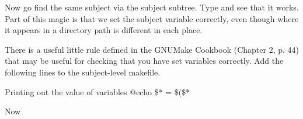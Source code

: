 Now go find the same subject via the subject subtree. Type
 and see that it works. Part of this magic is that we set
the subject variable correctly, even though where it appears in a
directory path is different in each place.

There is a useful little rule defined in the GNUMake Cookbook (Chapter
2, p. 44) that may be useful for checking that you have set variables correctly. Add the following lines to the subject-level makefile.


\begin{make}{Printing out the value of variables}
\tab @echo \$* = \$(\$*\)
\end{make}

Now 
